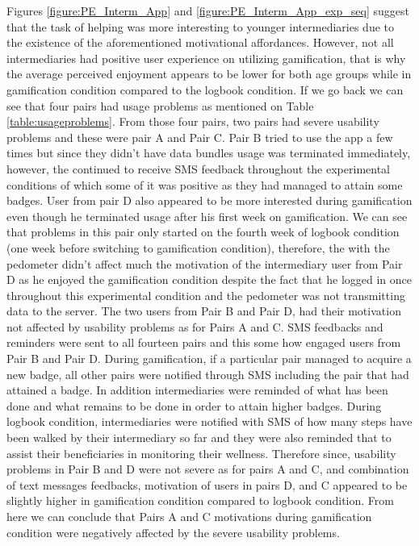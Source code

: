 Figures \ref{figure:PE_Interm_App} and \ref{figure:PE_Interm_App_exp_seq}  suggest that the task of helping was more interesting to younger intermediaries due to the existence of the aforementioned motivational affordances.  However, not all intermediaries had positive user experience on utilizing gamification, that is why the average perceived enjoyment appears to be lower for both age groups while in gamification condition compared to the logbook condition. If we go back we can see that four pairs had usage problems as mentioned on Table \ref{table:usageproblems}.  From those four pairs, two pairs had severe usability problems and these were pair A and Pair C. Pair B tried to use the app a few times but since they didn't have data bundles usage was terminated immediately, however, the continued to receive SMS feedback throughout the experimental conditions of which some of it was positive as they had managed to attain some badges. User from pair D also appeared to be more interested during gamification even though he terminated usage after his first week on gamification.  We can see that problems in this pair only started on the fourth week of logbook condition (one week before switching to gamification condition), therefore, the  with the pedometer didn't affect much the motivation of the intermediary user from Pair D as he enjoyed the gamification condition despite the fact that he logged in once throughout this experimental condition and the pedometer was not transmitting data to the server. The two users from Pair B and Pair D, had their motivation not affected by usability problems as for Pairs A and C. SMS feedbacks and reminders were sent to all fourteen pairs and this some how engaged users from Pair B and Pair D. During gamification, if a particular pair managed to acquire a new badge, all other pairs were notified through SMS including the pair that had attained a badge. In addition intermediaries were reminded of what has been done and what remains to be done in order to attain higher badges. During logbook condition, intermediaries were notified with SMS of how many steps have been walked by their intermediary so far and they were also reminded that to assist their beneficiaries in monitoring their wellness. Therefore since, usability problems in Pair B and D were not severe as for pairs A and C, and combination of text messages feedbacks, motivation of users in pairs D, and C appeared to be slightly higher in gamification condition compared to logbook condition. From here we can conclude that Pairs A and C motivations during gamification condition were negatively affected by the severe usability problems.\newline 
